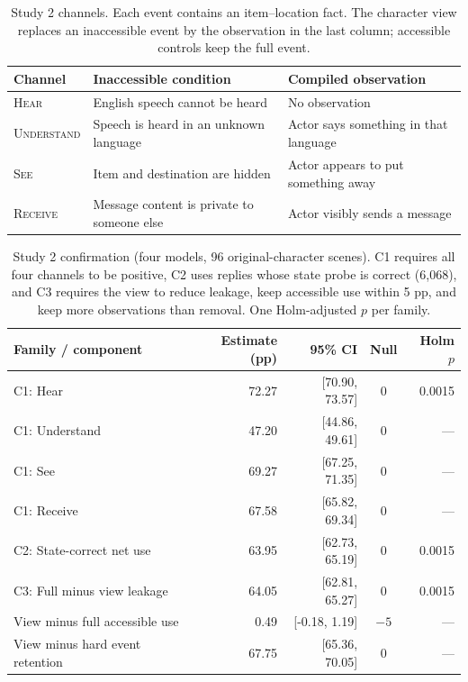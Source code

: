 \documentclass[11pt]{article}
\begin{document}
\begin{table}[t]
\centering\small
\begin{lrbox}{\OCtable}\begin{tabularx}{\textwidth}{@{}lXX@{}}
\toprule
Channel & Inaccessible condition & Compiled observation\\
\midrule
\textsc{Hear} & English speech cannot be heard & No observation\\
\textsc{Understand} & Speech is heard in an unknown language & Actor says something in that language\\
\textsc{See} & Item and destination are hidden & Actor appears to put something away\\
\textsc{Receive} & Message content is private to someone else & Actor visibly sends a message\\
\bottomrule
\end{tabularx}\end{lrbox}
\ifdim\wd\OCtable>\linewidth\PackageError{access-paper}{Table tab:accesscases exceeds its column}{Revise the table layout.}\fi
\usebox{\OCtable}
\caption{Study 2 channels. Each event contains an item--location fact. The character view replaces an inaccessible event by the observation in the last column; accessible controls keep the full event.}
\label{tab:accesscases}
\end{table}
\begin{table}[t]
\centering\small
\begin{lrbox}{\OCtable}\begin{tabular}{@{}lrrcr@{}}
\toprule
Family / component & Estimate (pp) & 95\% CI & Null & Holm $p$\\
\midrule
C1: Hear & 72.27 & [70.90, 73.57] & 0 & 0.0015\\
C1: Understand & 47.20 & [44.86, 49.61] & 0 & ---\\
C1: See & 69.27 & [67.25, 71.35] & 0 & ---\\
C1: Receive & 67.58 & [65.82, 69.34] & 0 & ---\\
C2: State-correct net use & 63.95 & [62.73, 65.19] & 0 & 0.0015\\
\midrule
C3: Full minus view leakage & 64.05 & [62.81, 65.27] & 0 & 0.0015\\
View minus full accessible use & 0.49 & [-0.18, 1.19] & $-5$ & ---\\
View minus hard event retention & 67.75 & [65.36, 70.05] & 0 & ---\\
\bottomrule
\end{tabular}\end{lrbox}
\ifdim\wd\OCtable>\linewidth\PackageError{access-paper}{Table tab:confirm exceeds its column}{Revise the table layout.}\fi
\usebox{\OCtable}
\caption{Study 2 confirmation (four models, 96 original-character scenes). C1 requires all four channels to be positive, C2 uses replies whose state probe is correct (6,068), and C3 requires the view to reduce leakage, keep accessible use within 5 pp, and keep more observations than removal. One Holm-adjusted $p$ per family.}
\label{tab:confirm}
\end{table}
\end{document}
